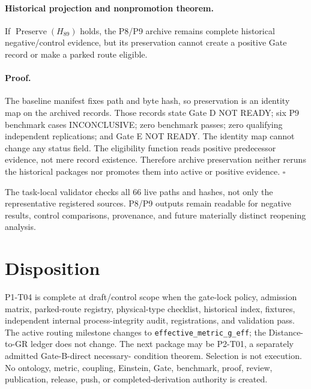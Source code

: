 \documentclass[11pt]{article}
\newcommand{\Preserve}{\operatorname{Preserve}}
\begin{document}
\paragraph{Historical projection and nonpromotion theorem.}
If $\Preserve(H_{89})$ holds, the P8/P9 archive remains complete historical
negative/control evidence, but its preservation cannot create a positive Gate
record or make a parked route eligible.

\paragraph{Proof.}
The baseline manifest fixes path and byte hash, so preservation is an identity
map on the archived records. Those records state Gate D NOT READY; six P9
benchmark cases INCONCLUSIVE; zero benchmark passes; zero qualifying
independent replications; and Gate E NOT READY. The identity map cannot change
any status field. The eligibility function reads positive predecessor evidence,
not mere record existence. Therefore archive preservation neither reruns the
historical packages nor promotes them into active or positive evidence.
$\square$

The task-local validator checks all 66 live paths and hashes, not only the
representative registered sources. P8/P9 outputs remain readable for negative
results, control comparisons, provenance, and future materially distinct
reopening analysis.

\section{Disposition}

P1-T04 is complete at draft/control scope when the gate-lock policy, admission
matrix, parked-route registry, physical-type checklist, historical index,
fixtures, independent internal process-integrity audit, registrations, and
validation pass. The active routing milestone changes to
\texttt{effective\_metric\_g\_eff}; the Distance-to-GR ledger does not change.
The next package may be P2-T01, a separately admitted Gate-B-direct necessary-
condition theorem. Selection is not execution. No ontology, metric, coupling,
Einstein, Gate, benchmark, proof, review, publication, release, push, or
completed-derivation authority is created.
\end{document}
